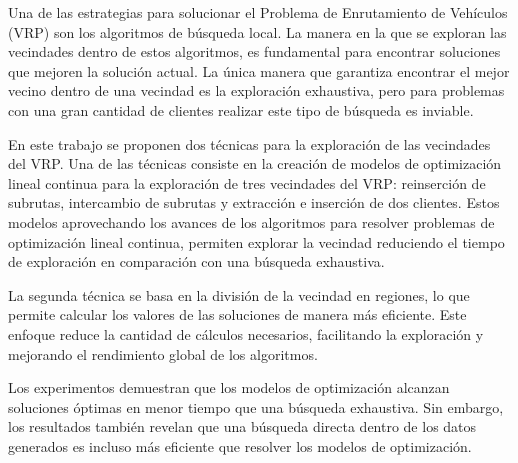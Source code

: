 \documentclass[12pt]{report}
\begin{document}
Una de las estrategias para solucionar el Problema de Enrutamiento de Vehículos (VRP) son los algoritmos de búsqueda local. La manera en la que se exploran las vecindades dentro de estos algoritmos, es fundamental para encontrar soluciones que mejoren la solución actual. La única manera que garantiza encontrar el mejor vecino dentro de una vecindad es la exploración exhaustiva, pero para problemas con una gran cantidad de clientes realizar este tipo de búsqueda es inviable.

En este trabajo se proponen dos técnicas para la exploración de las vecindades del VRP. Una de las técnicas consiste en la creación de modelos de optimización lineal continua para la exploración de tres vecindades del VRP: reinserción de subrutas, intercambio de subrutas y extracción e inserción de dos clientes. Estos modelos aprovechando los avances de los algoritmos para resolver problemas de optimización lineal continua, permiten explorar la vecindad reduciendo el tiempo de exploración en comparación con una búsqueda exhaustiva.

La segunda técnica se basa en la división de la vecindad en regiones, lo que permite calcular los valores de las soluciones de manera más eficiente. Este enfoque reduce la cantidad de cálculos necesarios, facilitando la exploración y mejorando el rendimiento global de los algoritmos.

Los experimentos demuestran que los modelos de optimización alcanzan soluciones óptimas en menor tiempo que una búsqueda exhaustiva. Sin embargo, los resultados también revelan que una búsqueda directa dentro de los datos generados es incluso más eficiente que resolver los modelos de optimización.
\end{document}
